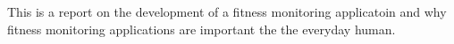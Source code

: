 This is a report on the development of a fitness monitoring applicatoin and why fitness monitoring applications are important the the everyday human.